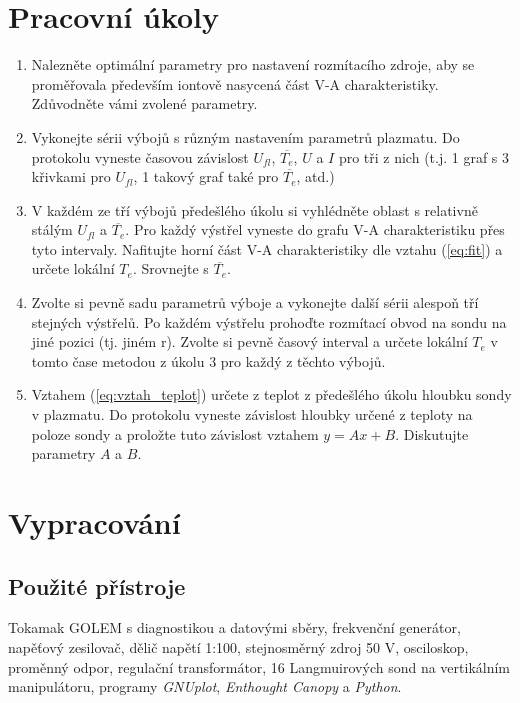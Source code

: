 \documentclass[english]{article}
\begin{document}


\setlength{\parindent}{0.5cm}
\section{Pracovní úkoly}
	  \begin{enumerate}
\item Nalezněte optimální parametry pro nastavení rozmítacího zdroje, aby se proměřovala především iontově nasycená část V-A charakteristiky. Zdůvodněte vámi zvolené parametry.
\item Vykonejte sérii výbojů s různým nastavením parametrů plazmatu. Do protokolu vyneste časovou závislost $U_{fl}$, $\overline{T_{e}}$, $U$ a $I$ pro tři z nich (t.j. 1 graf s 3 křivkami pro $U_{fl}$, 1 takový graf také pro $\overline{T_e}$, atd.)
\item V každém ze tří výbojů předešlého úkolu si vyhlédněte oblast s relativně stálým $U_{fl}$ a $\overline{T_{e}}$. Pro každý výstřel vyneste do grafu V-A charakteristiku přes tyto intervaly. Nafitujte horní část V-A charakteristiky dle vztahu (\ref{eq:fit}) a určete lokální $T_{e}$. Srovnejte s $\overline{T_{e}}$.
\item Zvolte si pevně sadu parametrů výboje a vykonejte další sérii alespoň tří stejných výstřelů. Po každém výstřelu prohoďte rozmítací obvod na sondu na jiné pozici (tj. jiném r). Zvolte si pevně časový interval a určete lokální $T_{e}$ v tomto čase metodou z úkolu 3 pro každý z těchto výbojů.
\item Vztahem (\ref{eq:vztah_teplot}) určete z teplot z předešlého úkolu hloubku sondy v plazmatu. Do protokolu vyneste závislost hloubky určené z teploty na poloze sondy a proložte tuto závislost vztahem $y= Ax+B$. Diskutujte parametry $A$ a $B$.
	  \end{enumerate}

\section{Vypracování}

	\subsection{Použité přístroje}
		Tokamak GOLEM s diagnostikou a datovými sběry, frekvenční generátor, napěťový zesilovač, dělič napětí 1:100, stejnosměrný zdroj 50 V, osciloskop, proměnný odpor, regulační transformátor, 16 Langmuirových sond na vertikálním manipulátoru, programy \emph{GNUplot}, \emph{Enthought Canopy} a \emph{Python}.
					
\end{document}

